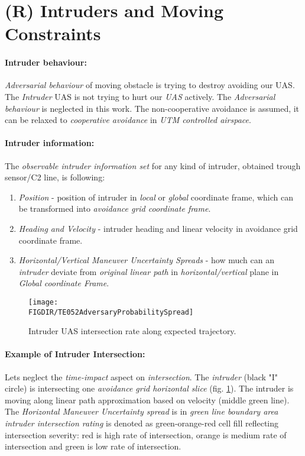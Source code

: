 \newpage
\section{(R) Intruders and Moving Constraints}\label{s:intruders}
\paragraph{Intruder behaviour:} \emph{Adversarial behaviour} of moving obstacle is trying to destroy avoiding our UAS.  The \emph{Intruder} UAS \cite{fiorini1998motion} is not trying to hurt our \emph{UAS} actively. The \emph{Adversarial behaviour} is neglected in this work. The non-cooperative avoidance is assumed, it can be relaxed to \emph{cooperative avoidance} in \emph{UTM controlled airspace}.

\paragraph{Intruder information:} The \emph{observable intruder information set} for any kind of intruder, obtained trough sensor/C2 line, is following:
\begin{enumerate}
    \item\emph{Position} - position of intruder in \emph{local} or \emph{global} coordinate frame, which can be transformed into \emph{avoidance grid coordinate frame}.
    
    \item\emph{Heading and Velocity} - intruder heading and linear velocity in avoidance grid coordinate frame.
    
    \item\emph{Horizontal/Vertical Maneuver Uncertainty Spreads} - how much can an \emph{intruder} deviate from \emph{original linear path} in \emph{horizontal/vertical} plane in \emph{Global coordinate Frame}.
\end{enumerate}

 

\begin{figure}[H]
    \centering
    \texttt{[image: \\FIGDIR/TE052AdversaryProbabilitySpread]}
    \caption{Intruder UAS intersection rate along expected trajectory.}
    \label{fig:intruderProbabiltySpreadTheoretical}
\end{figure}   

\paragraph{Example of Intruder Intersection:} Lets neglect the \emph{time-impact} aspect on \emph{intersection}.  The \emph{intruder} (black "I" circle) is intersecting one \emph{avoidance grid horizontal slice} (fig. \ref{fig:intruderProbabiltySpreadTheoretical}).  The intruder is moving along linear path approximation based on velocity (middle green line). The \emph{Horizontal Maneuver Uncertainty spread} is in \emph{green line boundary area} \emph{intruder intersection rating} is denoted as green-orange-red cell fill reflecting intersection severity:  red is high rate of intersection, orange is medium rate of intersection and green is low rate of intersection.
    


